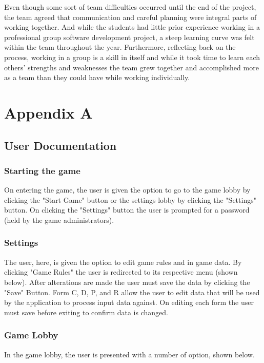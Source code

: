 \documentclass{l3proj}
\begin{document}
Even though some sort of team difficulties occurred until the end of the project, the team agreed that communication and careful planning were integral parts of working together. And while the students had little prior experience working in a professional group software development project, a steep learning curve was felt within the team throughout the year. Furthermore, reflecting back on the process, working in a group is a skill in itself and while it took time to learn each others' strengths and weaknesses the team grew together and accomplished more as a team than they could have while working individually.
\pagebreak
\section{Appendix A}
\label{sec:appendix}

\subsection{User Documentation}
\subsubsection{Starting the game}
On entering the game, the user is given the option to go to the game lobby by clicking the "Start Game" button or the settings lobby by clicking the "Settings" button. On clicking the "Settings" button the user is prompted for a password (held by the game administrators).

\subsubsection{Settings}


The user, here, is given the option to edit game rules and in game data. 
By clicking "Game Rules" the user is redirected to its respective menu (shown below). After alterations are made the user must save the data by clicking the "Save" Button.
Form C, D, P, and R allow the user to edit data that will be used by the application to process input data against. On editing each form the user must save before exiting to confirm data is changed.

\subsubsection{Game Lobby}
In the game lobby, the user is presented with a number of option, shown below.

\end{document}
